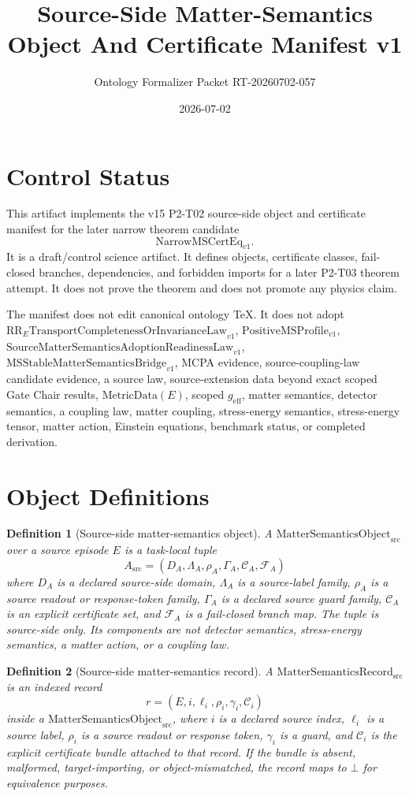 \documentclass[11pt]{article}
\title{Source-Side Matter-Semantics Object And Certificate Manifest v1}
\author{Ontology Formalizer Packet RT-20260702-057}
\date{2026-07-02}
\newcommand{\MSObj}{\mathrm{MatterSemanticsObject}_{\mathrm{src}}}
\newcommand{\MSRec}{\mathrm{MatterSemanticsRecord}_{\mathrm{src}}}
\newcommand{\Bottom}{\bot}
\newcommand{\PositiveMSProfile}{\mathrm{PositiveMSProfile}_{v1}}
\newcommand{\SMSAR}{\mathrm{SourceMatterSemanticsAdoptionReadinessLaw}_{v1}}
\newcommand{\LawRR}{\mathrm{RR}_{E}\mathrm{TransportCompletenessOrInvarianceLaw}_{v1}}
\newcommand{\MSStable}{\mathrm{MSStableMatterSemanticsBridge}_{v1}}
\newcommand{\MetricData}{\mathrm{MetricData}}
\newcommand{\geff}{g_{\mathrm{eff}}}
\newtheorem{definition}{Definition}
\begin{document}
\maketitle

\section{Control Status}

This artifact implements the v15 P2-T02 source-side object and certificate
manifest for the later narrow theorem candidate
\[
  \mathrm{NarrowMSCertEq}_{v1}.
\]
It is a draft/control science artifact. It defines objects, certificate
classes, fail-closed branches, dependencies, and forbidden imports for a later
P2-T03 theorem attempt. It does not prove the theorem and does not promote any
physics claim.

The manifest does not edit canonical ontology TeX. It does not adopt
\(\LawRR\), \(\PositiveMSProfile\), \(\SMSAR\), \(\MSStable\), MCPA evidence,
source-coupling-law candidate evidence, a source law, source-extension data
beyond exact scoped Gate Chair results, \(\MetricData(E)\), scoped \(\geff\),
matter semantics, detector semantics, a coupling law, matter coupling,
stress-energy semantics, stress-energy tensor, matter action, Einstein
equations, benchmark status, or completed derivation.

\section{Object Definitions}

\begin{definition}[Source-side matter-semantics object]
A \(\MSObj\) over a source episode \(E\) is a task-local tuple
\[
  A_{\mathrm{src}} =
  (D_A,\Lambda_A,\rho_A,\Gamma_A,\mathcal C_A,\mathcal F_A)
\]
where \(D_A\) is a declared source-side domain, \(\Lambda_A\) is a
source-label family, \(\rho_A\) is a source readout or response-token family,
\(\Gamma_A\) is a declared source guard family, \(\mathcal C_A\) is an
explicit certificate set, and \(\mathcal F_A\) is a fail-closed branch map.
The tuple is source-side only. Its components are not detector semantics,
stress-energy semantics, a matter action, or a coupling law.
\end{definition}

\begin{definition}[Source-side matter-semantics record]
A \(\MSRec\) is an indexed record
\[
  r=(E,i,\ell_i,\rho_i,\gamma_i,\mathcal C_i)
\]
inside a \(\MSObj\), where \(i\) is a declared source index, \(\ell_i\) is a
source label, \(\rho_i\) is a source readout or response token, \(\gamma_i\)
is a guard, and \(\mathcal C_i\) is the explicit certificate bundle attached
to that record. If the bundle is absent, malformed, target-importing, or
object-mismatched, the record maps to \(\Bottom\) for equivalence purposes.
\end{definition}
\end{document}

